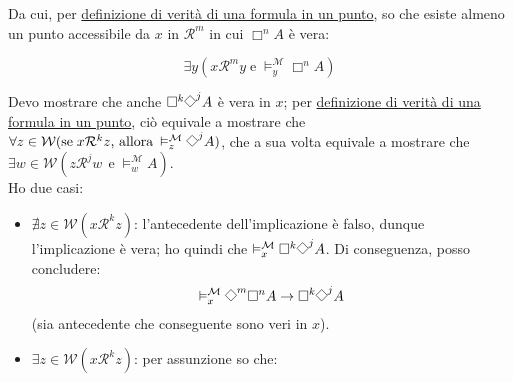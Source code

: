 \documentclass[a4paper,12pt]{article}
\newcommand{\Dmd}{\mathord{\vcenter{\hbox{\tikz[baseline=-0.6ex]{\draw[line width=0.4pt, scale=1, rotate=45] (0,0) rectangle (0.2,0.2);}}}}} %
\begin{document}
\begin{dimo}
\begin{enumerate}
		      Da cui, per \hyperlink{defverp}{definizione di verità di una formula in un punto}, so che esiste almeno un punto accessibile da $x$ in $\mathcal{R}^m$ in cui $\Box^n A$ è vera: \\

		      \begin{minipage}{0.48\textwidth}
			      $$\exists y (x\mathcal{R}^my \; \text{e} \; \vDash_y^{\mathcal{M}}\Box^n  A)$$
		      \end{minipage}
		      \begin{minipage}{0.48\textwidth}
			      \begin{center}
			      \end{center}
			      \vspace{8pt}

		      \end{minipage}
		      \vspace{8pt}

		      Devo mostrare che anche $\Box^k \Dmd^j A$ è vera in $x$; per \hyperlink{defverp}{definizione di verità di una formula in un punto}, ciò equivale a mostrare che $\forall z \in \mathcal{W} (\text{se} \; x\mathcal{R}^kz  \text{, allora} \: \vDash_z^{\mathcal{M}} \Dmd^j A)$, che a sua volta equivale a mostrare che $\exists w \in \mathcal{W} (z\mathcal{R}^jw \;\, \text{e} \; \vDash_w^{\mathcal{M}} A)$.\\
		      Ho due casi:
		      \begin{itemize}
			      \item $\nexists z \in \mathcal{W} (x\mathcal{R}^kz)$: l'antecedente dell'implicazione è falso, dunque l'implicazione è vera; ho quindi che $\vDash_x^{\mathcal{M}} \Box^k \Dmd^j A$. Di conseguenza, posso concludere:
			            $$\vDash_x^{\mathcal{M}} \Dmd^m \Box^n A \to \Box^k \Dmd^j A$$
			            (sia antecedente che conseguente sono veri in $x$).
			      \item $\exists z \in \mathcal{W} (x\mathcal{R}^kz)$: per assunzione so che:


\end{itemize}
\end{enumerate}
\end{dimo}
\end{document}
